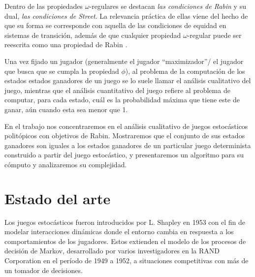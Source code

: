 Dentro de las propiedades $\omega$-regulares se destacan \textit{las
	condiciones de Rabin} y su dual, \textit{las condiciones de Street}. La
relevancia práctica de ellas viene del hecho de que su forma se corresponde con
aquella de las condiciones de equidad en sistemas de transición, además de que
cualquier propiedad $\omega$-regular puede ser reescrita como una propiedad de
Rabin \cite{AutomataLogicsInfiniteGames}.

Una vez fijado un jugador (generalmente el jugador ``maximizador''/ el jugador
que busca que se cumpla la propiedad $\phi$), al problema de la computación de
los estados estados ganadores de un juego se lo suele llamar el análisis
cualitativo del juego, mientras que el análisis cuantitativo del juego refiere
al problema de computar, para cada estado, cuál es la probabilidad máxima que
tiene este de ganar, aún cuando esta sea menor que 1.

En el trabajo nos concentraremos en el análisis cualitativo de juegos
estocásticos politópicos con objetivos de Rabin. Mostraremos que el conjunto de
sus estados ganadores son iguales a los estados ganadores de un particular
juego determinista construido a partir del juego estocástico, y presentaremos
un algoritmo para su cómputo y analizaremos su complejidad.


\section{Estado del arte}

Los juegos estocásticos fueron introducidos por L. Shapley en 1953
\cite{Shapley1953} con el fin de modelar interacciones dinámicas donde el
entorno cambia en respuesta a los comportamientos de los jugadores. Estos
extienden el modelo de los procesos de decisión de Markov, desarrollado por
varios investigadores en la RAND Corporation en el período de 1949 a 1952, a
situaciones competitivas con más de un tomador de decisiones.


